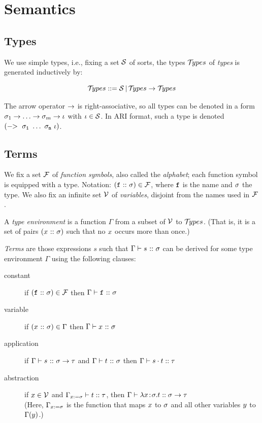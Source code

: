 \section{Semantics}

\subsection{Types}

We use simple types, i.e., fixing a set $\mathcal{S}$ of sorts, the types $\mathcal{T}\!ypes$ of \emph{types} is generated inductively by:

\[ \mathcal{T}\!ypes ::= \mathcal{S}\, |\, \mathcal{T}\!ypes \rightarrow \mathcal{T}\!ypes \]

The arrow operator $\rightarrow$ is right-associative, so all types can be denoted in a form
$\atype_1 \arrtype \dots \arrtype \atype_m \arrtype \asort$ with $\iota \in \mathcal{S}$.
In ARI format, such a type is denoted $\mathtt{(-\!\!>\ \sigma_1\ \dots\ \sigma_n\ \asort)}$.

\subsection{Terms}

We fix a set $\mathcal{F}$ of \emph{function symbols}, also called the \emph{alphabet}; each function
symbol is equipped with a type.  Notation: $(\mathtt{f} \ \mathtt{::}\  \sigma) \in \mathcal{F}$, where $\mathtt{f}$ is
the name and $\sigma$ the type.  We also fix an infinite set $\mathcal{V}$ of \emph{variables}, disjoint
from the names used in $\mathcal{F}$.

A \emph{type environment} is a function $\Gamma$ from a subset of $\mathcal{V}$ to $\mathcal{T}\!ypes$.
(That is, it is a set of pairs $(x \ \mathtt{::}\  \sigma)$ such that no $x$ occurs more than
once.)

\emph{Terms} are those expressions $s$ such that $\Gamma \vdash s \ \mathtt{::}\  \sigma$ can be derived
for some type environment $\Gamma$ using the following clauses:

\begin{description}
\item[constant] if $(\mathtt{f} \ \mathtt{::}\  \sigma) \in \mathcal{F}$ then $\Gamma \vdash \mathtt{f} \ \mathtt{::}\  \sigma$
\item[variable] if $(x \ \mathtt{::}\  \sigma) \in \Gamma$ then $\Gamma \vdash x \ \mathtt{::}\  \sigma$
\item[application] if $\Gamma \vdash s \ \mathtt{::}\  \sigma \rightarrow \tau$ and
  $\Gamma \vdash t \ \mathtt{::}\  \sigma$ then $\Gamma \vdash s \cdot t :: \tau$
\item[abstraction] if $x \in \mathcal{V}$ and $\Gamma_{x:=\sigma} \vdash t :: \tau$, then
  $\Gamma \vdash \lambda x\!:\!\sigma.t :: \sigma \rightarrow \tau$ \\
  (Here, $\Gamma_{x:=\sigma}$ is the function that maps $x$ to $\sigma$ and all other
  variables $y$ to $\Gamma(y)$.)
\end{description}

